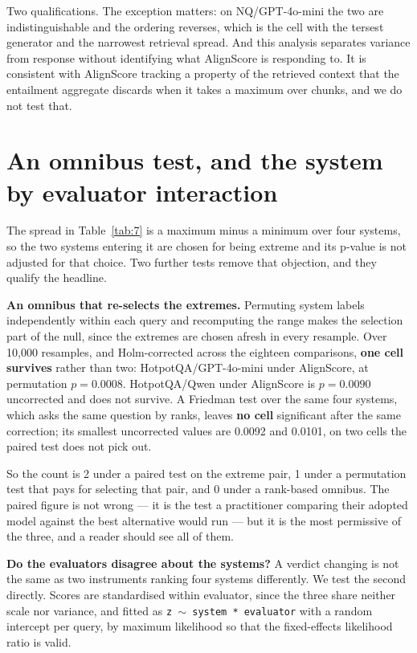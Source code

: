 \documentclass[11pt]{article}
\begin{document}
Two qualifications. The exception matters: on NQ/GPT-4o-mini the two are indistinguishable and the ordering reverses, which is the cell with the tersest generator and the narrowest retrieval spread. And this analysis separates variance from response without identifying what AlignScore is responding to. It is consistent with AlignScore tracking a property of the retrieved context that the entailment aggregate discards when it takes a maximum over chunks, and we do not test that.




\section{An omnibus test, and the system by evaluator interaction}
\label{app:omnibus}

The spread in Table~\ref{tab:7} is a maximum minus a minimum over four systems, so the two systems entering it are chosen for being extreme and its p-value is not adjusted for that choice. Two further tests remove that objection, and they qualify the headline.

\textbf{An omnibus that re-selects the extremes.} Permuting system labels independently within each query and recomputing the range makes the selection part of the null, since the extremes are chosen afresh in every resample. Over 10,000 resamples, and Holm-corrected across the eighteen comparisons, \textbf{one cell survives} rather than two: HotpotQA/GPT-4o-mini under AlignScore, at permutation $p = 0.0008$. HotpotQA/Qwen under AlignScore is $p = 0.0090$ uncorrected and does not survive. A Friedman test over the same four systems, which asks the same question by ranks, leaves \textbf{no cell} significant after the same correction; its smallest uncorrected values are 0.0092 and 0.0101, on two cells the paired test does not pick out.

So the count is 2 under a paired test on the extreme pair, 1 under a permutation test that pays for selecting that pair, and 0 under a rank-based omnibus. The paired figure is not wrong --- it is the test a practitioner comparing their adopted model against the best alternative would run --- but it is the most permissive of the three, and a reader should see all of them.

\textbf{Do the evaluators disagree about the systems?} A verdict changing is not the same as two instruments ranking four systems differently. We test the second directly. Scores are standardised within evaluator, since the three share neither scale nor variance, and fitted as \texttt{z $\sim$ system * evaluator} with a random intercept per query, by maximum likelihood so that the fixed-effects likelihood ratio is valid.
\end{document}
